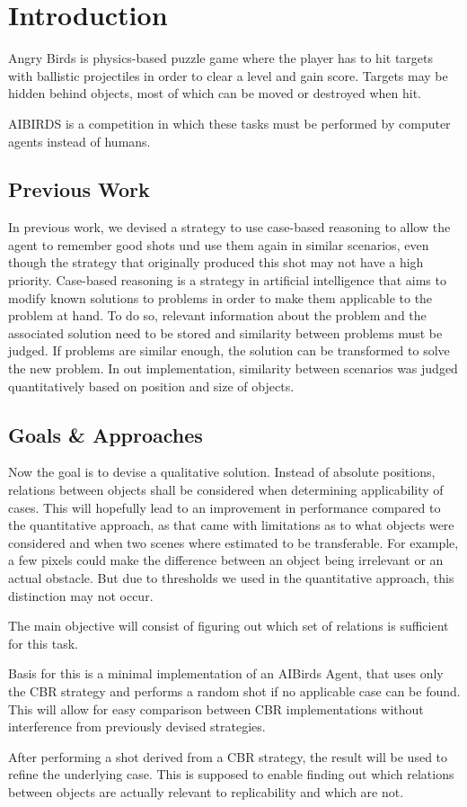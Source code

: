 \section{Introduction}

Angry Birds is physics-based puzzle game where the player has to hit targets with ballistic projectiles in order to clear a level and gain score.
Targets may be hidden behind objects, most of which can be moved or destroyed when hit.

AIBIRDS is a competition in which these tasks must be performed by computer agents instead of humans.


\subsection{Previous Work}
In previous work, we devised a strategy to use case-based reasoning to allow the agent to remember good shots und use them again in similar scenarios, even though the strategy that originally produced this shot may not have a high priority.
Case-based reasoning is a strategy in artificial intelligence that aims to modify known solutions to problems in order to make them applicable to the problem at hand.
To do so, relevant information about the problem and the associated solution need to be stored and similarity between problems must be judged.
If problems are similar enough, the solution can be transformed to solve the new problem.
In out implementation, similarity between scenarios was judged quantitatively based on position and size of objects.


\subsection{Goals \& Approaches}

Now the goal is to devise a qualitative solution.
Instead of absolute positions, relations between objects shall be considered when determining applicability of cases.
This will hopefully lead to an improvement in performance compared to the quantitative approach, as that came with limitations as to what objects were considered and when two scenes where estimated to be transferable.
For example, a few pixels could make the difference between an object being irrelevant or an actual obstacle. 
But due to thresholds we used in the quantitative approach, this distinction may not occur.

The main objective will consist of figuring out which set of relations is sufficient for this task.

Basis for this is a minimal implementation of an AIBirds Agent, that uses only the CBR strategy and performs a random
shot if no applicable case can be found.
This will allow for easy comparison between CBR implementations without interference from previously devised strategies.

After performing a shot derived from a CBR strategy, the result will be used to refine the underlying case.
This is supposed to enable finding out which relations between objects are actually relevant to replicability and which are not.